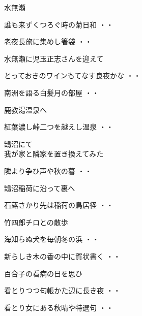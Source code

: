 \vspace{0.6cm}
水無瀬
\begin{shiika}誰も来ずくつろぐ時の菊日和
\hfill{・・}\end{shiika}
\vspace{0.6cm}
\begin{shiika}老夜長旅に集めし箸袋
\hfill{・・}\end{shiika}
\vspace{0.6cm}
水無瀬に児玉正志さんを迎えて
\begin{shiika}とっておきのワインもてなす良夜かな
\hfill{・・}\end{shiika}
\vspace{0.6cm}
\begin{shiika}南洲を語る白髪月の部屋
\hfill{・・}\end{shiika}
\vspace{0.6cm}
鹿教湯温泉へ
\begin{shiika}紅葉濃し峠二つを越えし温泉
\hfill{・・}\end{shiika}
\vspace{0.6cm}
鵠沼にて\\
我が家と隣家を置き換えてみた
\begin{shiika}隣より争ひ声や秋の暮
\hfill{・・}\end{shiika}
\vspace{0.6cm}
鵠沼稲荷に沿って裏へ
\begin{shiika}石蕗さかり先は稲荷の鳥居径
\hfill{・・}\end{shiika}
\vspace{0.6cm}
竹四郎チロとの散歩
\begin{shiika}海知らぬ犬を毎朝冬の浜
\hfill{・・}\end{shiika}
\vspace{0.6cm}
\begin{shiika}新らしき木の香の中に賀状書く
\hfill{・・}\end{shiika}
\vspace{0.6cm}
百合子の看病の日を思ひ
\begin{shiika}看とりつつ句帳かた辺に長き夜
\hfill{・・}\end{shiika}
\begin{shiika}看とり女にある秋晴や特選句
\hfill{・・}\end{shiika}
